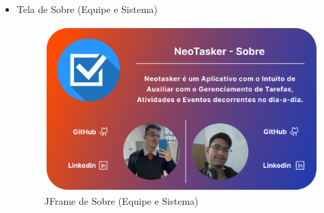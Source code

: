 \documentclass[a4paper,12pt]{article}
\begin{document}
\begin{itemize}
	\item Tela de Sobre (Equipe e Sistema)
	\begin{figure}[H]
		\centering
		\includegraphics[scale=0.20]{prototypes/white/About Us Panel Window.png}
		\caption{JFrame de Sobre (Equipe e Sistema)}
	\end{figure}
\end{itemize}

\end{document}
